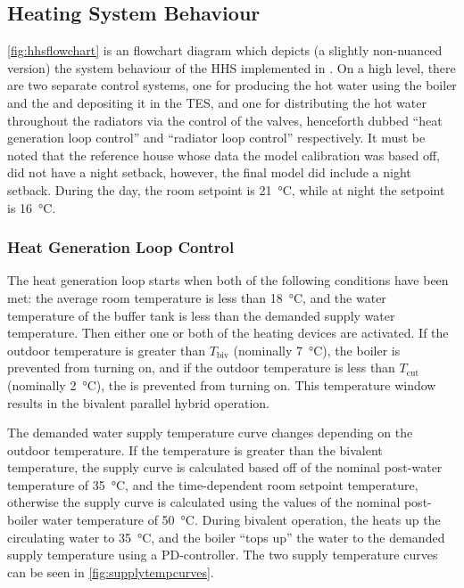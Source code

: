 \subsection{Heating System Behaviour}
\cref{fig:hhsflowchart} is an flowchart diagram which depicts (a slightly non-nuanced version) the system behaviour of the \ac{HHS} implemented in \modelica. 
On a high level, there are two separate control systems, one for producing the hot water using the boiler and the \HP and depositing it in the \ac{TES}, and one for distributing the hot water throughout the radiators via the control of the valves, henceforth dubbed ``heat generation loop control'' and ``radiator loop control'' respectively. It must be noted that the reference house whose data the model  calibration was based off, did not have a night setback, however, the final model did include a night setback. During the day, the room setpoint is \qty{21}{\celsius}, while at night the setpoint is \qty{16}{\celsius}.

\subsubsection{Heat Generation Loop Control} \label{subsubsec:heatgenloopcont}
The heat generation loop starts when both of the following conditions have been met: the average room temperature is less than \qty{18}{\celsius}, and the water temperature of the buffer tank is less than the demanded supply water temperature. Then either one or both of the heating devices are activated. If the outdoor temperature is greater than $T_\text{biv}$ (nominally \qty{7}{\celsius}), the boiler is prevented from turning on, and if the outdoor temperature is less than $T_\text{cut}$ (nominally \qty{2}{\celsius}), the \HP is prevented from turning on. This temperature window results in the bivalent parallel hybrid operation. 

The demanded water supply temperature curve changes depending on the outdoor temperature. If the temperature is greater than the bivalent temperature, the supply curve is calculated based off of the nominal post-\HP water temperature of \qty{35}{\celsius}, and the time-dependent room setpoint temperature, otherwise the supply curve is calculated using the values of the nominal post-boiler water temperature of \qty{50}{\celsius}. During bivalent operation, the \HP heats up the circulating water to \qty{35}{\celsius}, and the boiler ``tops up'' the water to the demanded supply temperature using a PD-controller. The two supply temperature curves can be seen in \cref{fig:supplytempcurves}.

